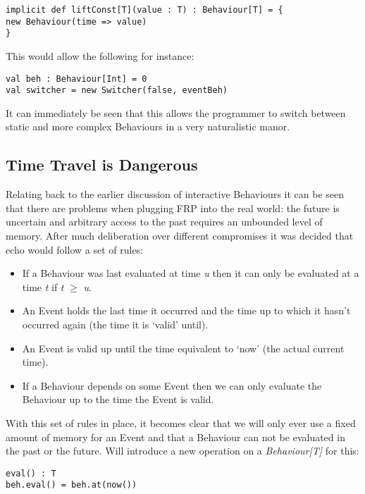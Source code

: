 \begin{verbatim}
implicit def liftConst[T](value : T) : Behaviour[T] = {
new Behaviour(time => value)
}
\end{verbatim}              
      
      This would allow the following for instance:

\begin{verbatim}
val beh : Behaviour[Int] = 0
val switcher = new Switcher(false, eventBeh)
\end{verbatim}       

      It can immediately be seen that this allows the programmer to switch between static and more complex
      Behaviours in a very naturalistic manor.
    
    \subsection{Time Travel is Dangerous}
      Relating back to the earlier discussion of interactive Behaviours it can be seen
      that there are problems when plugging FRP into the real world: the future is uncertain and
      arbitrary access to the past requires an unbounded level of memory. After much deliberation
      over different compromises it was decided that echo would follow a set of rules:
      
      \begin{itemize}
        \item If a Behaviour was last evaluated at time \emph{u} then it can only be evaluated at
        a time \emph{t} if \emph{t} $\geq$ \emph{u}.
        \item An Event holds the last time it occurred and the time up to which it hasn't occurred
        again (the time it is `valid' until).
        \item An Event is valid up until the time equivalent to `now' (the actual current time).
        \item If a Behaviour depends on some Event then we can only evaluate the Behaviour up to
        the time the Event is valid.
      \end{itemize}
      
      With this set of rules in place, it becomes clear that we will only ever use a fixed amount of memory
      for an Event and that a Behaviour can not be evaluated in the past or the future. Will
      introduce a new operation on a \emph{Behaviour[T]} for this:

\begin{verbatim}
eval() : T
beh.eval() = beh.at(now())
\end{verbatim}       

